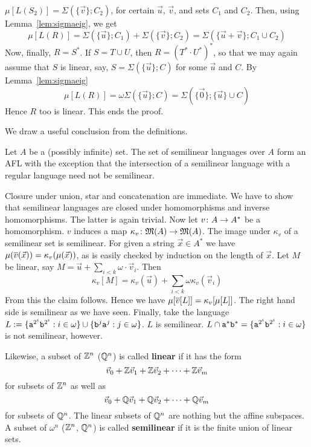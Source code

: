 $\mu[L(S_2)] = \Sigma(\{\vec{v}\};C_2)$, for certain $\vec{u}$, 
$\vec{v}$, and sets $C_1$ and $C_2$. Then, using 
Lemma~\ref{lem:sigmaeig}, we get
\begin{equation}
\mu[L(R)] = \Sigma(\{\vec{u}\};C_1) + \Sigma(\{\vec{v}\};C_2) = 
\Sigma(\{\vec{u}+\vec{v}\};C_1\cup C_2)
\end{equation}
Now, finally, $R = S^{\ast}$. If $S = T \cup U$,
then $R = (T^{\ast} \cdot U^{\ast})^{\ast}$, so that we may
again assume that $S$ is linear, say, $S = \Sigma(\{\vec{u}\}; C)$ 
for some $\vec{u}$ and $C$. By Lemma~\ref{lem:sigmaeig} 
\begin{equation}
\mu[L(R)] = \omega\Sigma(\{\vec{u}\};C) = \Sigma(\{\vec{0}\};\{\vec{u}\} 
\cup C)
\end{equation}
Hence $R$ too is linear. This ends the proof.
\proofend

We draw a useful conclusion from the definitions.
\begin{thm}
Let $A$ be a (possibly infinite) set. The set of semilinear
languages over $A$ form an AFL with the exception that the
intersection of a semilinear language with a regular language
need not be semilinear.
\end{thm}
\proofbeg
Closure under union, star and concatenation are immediate.
We have to show that semilinear languages are closed under
homomorphisms and inverse homomorphisms. The latter is again
trivial. Now let $v \colon A \rightarrow A^{\ast}$ be a homomorphism.
$v$ induces a map $\kappa_v \colon \mathfrak{M}(A) \rightarrow \mathfrak{M}(A)$.
The image under $\kappa_v$ of a semilinear set is semilinear.
For given a string $\vec{x} \in A^{\ast}$ we have
$\mu(\overline{v}(\vec{x})) = \kappa_v(\mu(\vec{x}))$, as is easily
checked by induction on the length of $\vec{x}$.
Let $M$ be linear, say $M = \vec{u} + \sum_{i < k} \omega \cdot
\vec{v}_i$. Then
\begin{equation}
\kappa_v[M] = \kappa_v(\vec{u}) + \sum_{i < k} \omega 
\kappa_v(\vec{v}_i) 
\end{equation}
From this the claim follows. Hence we have
$\mu[\overline{v}[L]] = \kappa_v[\mu[L]]$. The right hand side is
semilinear as we have seen. Finally, take the language
$L := \{\mbox{\tt a}^{2^i}\mbox{\tt b}^{2^i} : i \in \omega\}
\cup \{\mbox{\tt b}^j\mbox{\tt a}^j : j \in \omega\}$.
$L$ is semilinear. $L \cap \mbox{\tt a}^{\ast}\mbox{\tt b}^{\ast}
= \{\mbox{\tt a}^{2^i}\mbox{\tt b}^{2^i} : i \in \omega\}$
is not semilinear, however.
\proofend

Likewise, a subset of $\mathbb{Z}^n$ ($\mathbb{Q}^n$) is called \textbf{linear} if it 
has the form
\begin{equation}
\vec{v}_0 + \mathbb{Z} \vec{v}_1 + \mathbb{Z} \vec{v}_2 + \dotsb + \mathbb{Z} \vec{v}_m
\end{equation}
for subsets of $\mathbb{Z}^n$ as well as 
\begin{equation}
\vec{v}_0 + \mathbb{Q} \vec{v}_1 + \mathbb{Q} \vec{v}_2 + \dotsb + \mathbb{Q} \vec{v}_m
\end{equation}
for subsets of $\mathbb{Q}^n$. The linear subsets of $\mathbb{Q}^n$ are nothing but 
the affine subspaces. A subset of $\omega^n$ ($\mathbb{Z}^n$, $\mathbb{Q}^n$) is called 
\textbf{semilinear} if it is the finite union of linear sets. 

